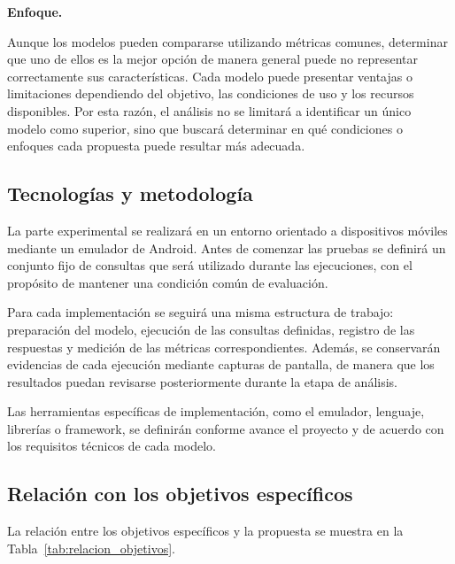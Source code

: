 \textbf{Enfoque.}

Aunque los modelos pueden compararse utilizando métricas comunes, determinar que uno de ellos es la mejor opción de manera general puede no representar correctamente sus características. Cada modelo puede presentar ventajas o limitaciones dependiendo del objetivo, las condiciones de uso y los recursos disponibles. Por esta razón, el análisis no se limitará a identificar un único modelo como superior, sino que buscará determinar en qué condiciones o enfoques cada propuesta puede resultar más adecuada.


\subsection{Tecnologías y metodología}

La parte experimental se realizará en un entorno orientado a dispositivos móviles mediante un emulador de Android. Antes de comenzar las pruebas se definirá un conjunto fijo de consultas que será utilizado durante las ejecuciones, con el propósito de mantener una condición común de evaluación.

Para cada implementación se seguirá una misma estructura de trabajo: preparación del modelo, ejecución de las consultas definidas, registro de las respuestas y medición de las métricas correspondientes. Además, se conservarán evidencias de cada ejecución mediante capturas de pantalla, de manera que los resultados puedan revisarse posteriormente durante la etapa de análisis.

Las herramientas específicas de implementación, como el emulador, lenguaje, librerías o framework, se definirán conforme avance el proyecto y de acuerdo con los requisitos técnicos de cada modelo.


\subsection{Relación con los objetivos específicos}

La relación entre los objetivos específicos y la propuesta se muestra en la Tabla~\ref{tab:relacion_objetivos}.

